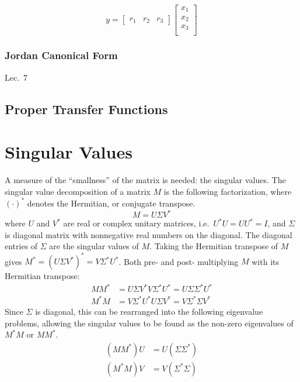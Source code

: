 \begin{equation*} y=
  \begin{bmatrix}
    r_1 & r_2 & r_3
  \end{bmatrix}
  \begin{bmatrix}
    x_1 \\ %
    x_2 \\
    x_3 \\
  \end{bmatrix}
\end{equation*}

\subsubsection{Jordan Canonical Form}
Lec.\ 7

\subsection{Proper Transfer Functions}

\section{Singular Values}

A measure of the ``smallness'' of the matrix is needed: the singular values.
The singular value decomposition of a matrix $M$ is the following factorization, where $(\cdot)^{*}$ denotes the Hermitian, or conjugate transpose.
\begin{equation*}
  M=U\Sigma V^{*}
\end{equation*}
where $U$ and $V^{*}$ are real or complex unitary matrices, i.e.\ $U^{*}U=UU^{*}=I$, and $\Sigma$ is diagonal matrix with nonnegative real numbers on the diagonal.
The diagonal entries of $\Sigma$ are the singular values of $M$.
Taking the Hermitian transpose of $M$ gives $M^{*}=(U\Sigma V^{*})^{*}=V\Sigma^{*}U^{*}$.
Both pre- and post- multiplying $M$ with its Hermitian transpose:
\begin{equation*}
  \begin{split}
    MM^{*}&=U\Sigma V^{*}V\Sigma^{*}U^{*}=U\Sigma \Sigma^{*}U^{*} \\
    M^{*}M&=V\Sigma^{*}U^{*}U\Sigma V^{*}=V\Sigma^{*}\Sigma V^{*}
  \end{split}
\end{equation*}
Since $\Sigma$ is diagonal, this can be rearranged into the following eigenvalue problems, allowing the singular values to be found as the non-zero eigenvalues of $M^{*}M$ or $MM^{*}$.
\begin{equation*}
  \begin{split}
    (MM^{*})U&=U(\Sigma \Sigma^{*}) \\
    (M^{*}M)V&=V(\Sigma^{*}\Sigma)
  \end{split}
\end{equation*}

